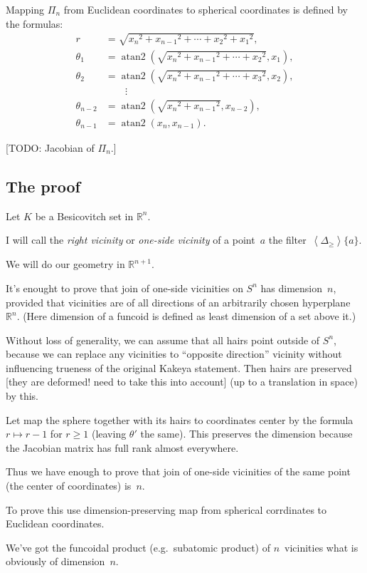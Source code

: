 \documentclass{amsart}
\newcommand{\supfun}[1]{\left\langle#1\right\rangle}
\begin{document}
Mapping $\Pi_n$ from Euclidean coordinates to spherical coordinates is defined by the formulas:
\[
\begin{aligned}r&={\textstyle {\sqrt {{x_{n}}^{2}+{x_{n-1}}^{2}+\cdots +{x_{2}}^{2}+{x_{1}}^{2}}}},\\\theta _{1}&=\operatorname {atan2} \left({\textstyle {\sqrt {{x_{n}}^{2}+{x_{n-1}}^{2}+\cdots +{x_{2}}^{2}}}},x_{1}\right),\\\theta _{2}&=\operatorname {atan2} \left({\textstyle {\sqrt {{x_{n}}^{2}+{x_{n-1}}^{2}+\cdots +{x_{3}}^{2}}}},x_{2}\right),\\&\qquad \vdots \\\theta _{n-2}&=\operatorname {atan2} \left({\textstyle {\sqrt {{x_{n}}^{2}+{x_{n-1}}^{2}}}},x_{n-2}\right),\\\theta _{n-1}&=\operatorname {atan2} \left(x_{n},x_{n-1}\right).\end{aligned}
\]  

[TODO: Jacobian of $\Pi_n$.]

\subsection{The proof}

Let $K$ be a Besicovitch set in $\mathbb{R}^n$.

I will call the \emph{right vicinity} or \emph{one-si\-de vicinity} of a point~$a$ the filter~$\supfun{\Delta_{\geq}}\{a\}$.

We will do our geometry in $\mathbb{R}^{n+1}$.

It's enought to prove that join of one-si\-de vicinities on $S^n$ has dimension~$n$, provided that vicinities are of all directions
of an arbitrarily chosen hyperplane~$\mathbb{R}^n$.
(Here dimension of a funcoid is defined as least dimension of a set above it.)

Without loss of generality, we can assume that all hairs point outside of $S^n$, because we can replace any vicinities to ``opposite direction'' vicinity without influencing trueness of the original Kakeya statement. Then hairs are preserved [they are deformed! need to take this into account] (up to a translation in space) by this.

Let map the sphere together with its hairs to coordinates center by the formula $r\mapsto r-1$ for $r\geq 1$ (leaving $\theta'$ the same).
This preserves the dimension because the Jacobian matrix has full rank almost everywhere.

Thus we have enough to prove that join of one-si\-de vicinities of the same point (the center of coordinates) is~$n$.

To prove this use di\-men\-si\-on-pre\-ser\-ving map from spherical corrdinates to Euclidean coordinates.

We've got the funcoidal product (e.g.\ subatomic product) of $n$\ vicinities what is obviously of dimension~$n$.



\end{document}
